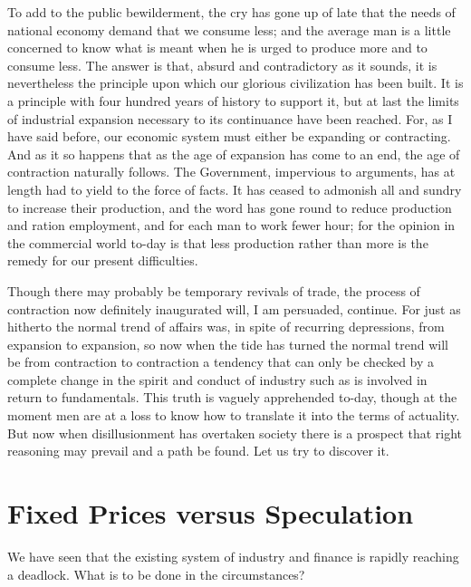 \documentclass{book}
\begin{document}
To add to the public bewilderment, the cry has gone up of late that the needs of national economy demand that we consume less; and the average man is a little concerned to know what is meant when he is urged to produce more and to consume less. The answer is that, absurd and contradictory as it sounds, it is nevertheless the principle upon which our glorious civilization has been built. It is a principle with four hundred years of history to support it, but at last the limits of industrial expansion necessary to its continuance have been reached. For, as I have said before, our economic system must either be expanding or contracting. And as it so happens that as the age of expansion has come to an end, the age of contraction naturally follows. The Government, impervious to arguments, has at length had to yield to the force of facts. It has ceased to admonish all and sundry to increase their production, and the word has gone round to reduce production and ration employment, and for each man to work fewer hour; for the opinion in the commercial world to-day is that less production rather than more is the remedy for our present difficulties.

Though there may probably be temporary revivals of trade, the process of contraction now definitely inaugurated will, I am persuaded, continue. For just as hitherto the normal trend of affairs was, in spite of recurring depressions, from expansion to expansion, so now when the tide has turned the normal trend will be from contraction to contraction a tendency that can only be checked by a complete change in the spirit and conduct of industry such as is involved in return to fundamentals. This truth is vaguely apprehended to-day, though at the moment men are at a loss to know how to translate it into the terms of actuality. But now when disillusionment has overtaken society there is a prospect that right reasoning may prevail and a path be found. Let us try to discover it.

\chapter{Fixed Prices versus Speculation}
\label{chapter-6}
We have seen that the existing system of industry and finance is rapidly reaching a deadlock. What is to be done in the circumstances?
\end{document}

